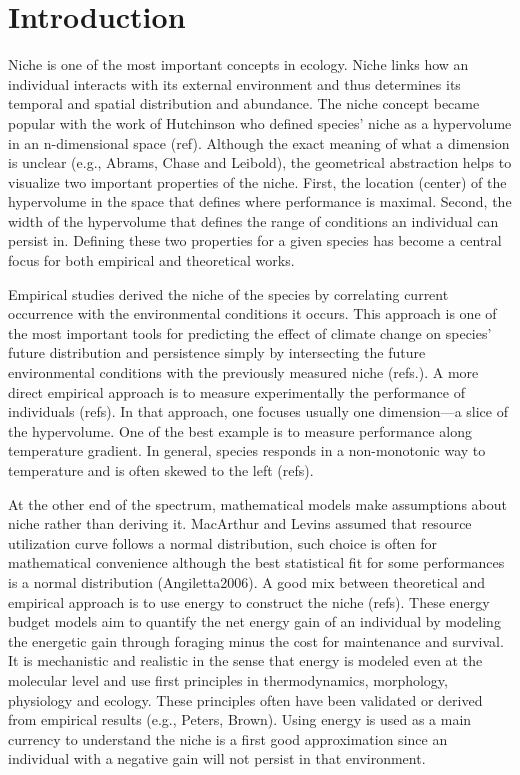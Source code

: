 \section*{Introduction}
Niche is one of the most important concepts in ecology.
Niche links how an individual interacts with its external environment and thus determines its temporal and spatial distribution and abundance.
The niche concept became popular with the work of Hutchinson who defined species' niche as a hypervolume in an n-dimensional space (ref).
Although the exact meaning of what a dimension is unclear (e.g., Abrams, Chase and Leibold), the geometrical abstraction helps to visualize two important properties of the niche.
First, the location (center) of the hypervolume in the space that defines where performance is maximal.
Second, the width of the hypervolume that defines the range of conditions an individual can persist in. 
Defining these two properties for a given species has become a central focus for both empirical and theoretical works.


Empirical studies derived the niche of the species by correlating current occurrence with the environmental conditions it occurs. 
This approach is one of the most important tools for predicting the effect of climate change on species' future distribution and persistence simply by intersecting the future environmental conditions with the previously measured niche (refs.).
A more direct empirical approach is to measure experimentally the performance of individuals (refs).
In that approach, one focuses usually one dimension---a slice of the hypervolume.
One of the best example is to measure performance along temperature gradient. 
In general, species responds in a non-monotonic way to temperature and is often skewed to the left (refs).

At the other end of the spectrum, mathematical models make assumptions about niche rather than deriving it. 
MacArthur and Levins assumed that resource utilization curve follows a normal distribution, such choice is often for mathematical convenience although the best statistical fit for some performances is a normal distribution (Angiletta2006). 
A good mix between theoretical and empirical approach is to use energy to construct the niche (refs).
These energy budget models aim to quantify the net energy gain of an individual by modeling the energetic gain through foraging minus the cost for maintenance and survival.
It is mechanistic and realistic in the sense that energy is modeled even at the molecular level and use first principles in thermodynamics, morphology, physiology and ecology.
These principles often have been validated or derived from empirical results (e.g., Peters, Brown).
Using energy is used as a main currency to understand the niche is a first good approximation since an individual with a negative gain will not persist in that environment.

